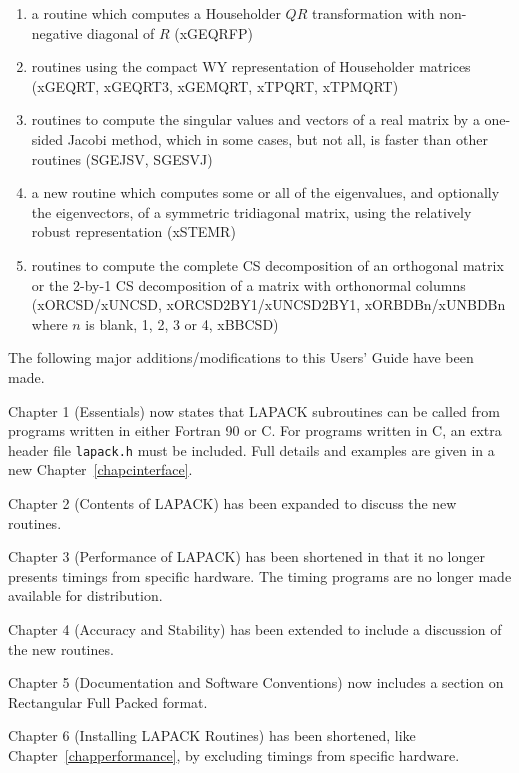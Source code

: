 \begin{enumerate}
\item a routine which computes a Householder $QR$ transformation 
with non-negative diagonal of $R$ (xGEQRFP)

\item routines using the compact WY representation of Householder matrices
(xGEQRT, xGEQRT3, xGEMQRT, xTPQRT, xTPMQRT)

\item routines to compute the singular values and vectors of a real matrix
by a one-sided Jacobi method, which in some cases, but not all, is faster than other routines
(SGEJSV, SGESVJ)

\item a new routine which computes some or all of the eigenvalues, and optionally the eigenvectors,
of a symmetric tridiagonal matrix, using the relatively robust representation (xSTEMR)

\item routines to compute the complete CS decomposition of an orthogonal matrix
or the 2-by-1 CS decomposition of a matrix with orthonormal columns
(\mbox{xORCSD/xUNCSD}, \linebreak
 \mbox{xORCSD2BY1/xUNCSD2BY1}, 
 \mbox{xORBDBn/xUNBDBn} where $n$ is blank, 1, 2, 3 or 4, \linebreak
 \mbox{xBBCSD})

\end{enumerate}

The following major additions/modifications to this Users' Guide have been made.

Chapter 1 (Essentials) now states that LAPACK subroutines can be called from programs written
in either Fortran 90 or C. For programs written in C, an extra header file {\tt lapack.h} must be 
included. Full details and examples are given in a new Chapter~\ref{chapcinterface}.

Chapter 2 (Contents of LAPACK) has been expanded to discuss the new routines.

Chapter 3 (Performance of LAPACK) has been shortened in that it no longer presents
timings from specific hardware. The timing programs are no longer made available for
distribution.

Chapter 4 (Accuracy and Stability) has been extended to include a discussion of the new
routines.

Chapter 5 (Documentation and Software Conventions) now includes a section on
Rectangular Full Packed format. 

Chapter 6 (Installing LAPACK Routines) has been shortened,
like Chapter~\ref{chapperformance}, by excluding
timings from specific hardware.

